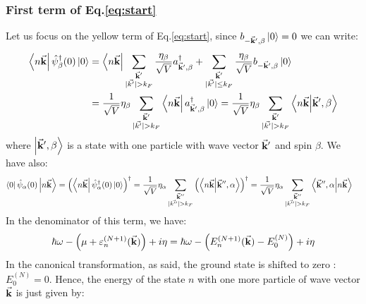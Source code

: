 \documentclass[11pt, a4paper, twoside, openright]{article}
\begin{document}
\subsubsection*{First term of Eq.\eqref{eq:start}}
Let us focus on the yellow term of Eq.\eqref{eq:start}, since \( b_{-\va{k}',\beta } \ket{0} = 0 \) we can write:
\begin{equation*}
\begin{split}
  \bra{n \va{k}} \hat{\psi }_ \beta ^\dag (0) \ket{0} &=
  \bra{n \va{k}} \sum_{\substack{\va{k}' \\ | \vec{k'} | > k_F  } }^{}  \frac{\eta _ \beta }{\sqrt{V} } a_{\va{k}', \beta } ^\dag
  +
  \sum_{\substack{\va{k}' \\ | \vec{k'} | \le k_F  } }^{}  \frac{\eta _ \beta }{\sqrt{V} } b_{-\va{k}', \beta } \ket{0} \\
  &=
  \frac{1}{\sqrt{V} } \eta _ \beta
  \sum_{\substack{\va{k}' \\ | \vec{k'} | > k_F  } }^{}   \bra{n \va{k}}
  a_{\va{k}', \beta } ^\dag \ket{0}
 = \frac{1}{\sqrt{V} } \eta _ \beta
 \sum_{\substack{\va{k}' \\ | \vec{k'} | > k_F  } }^{}   \braket{n \va{k}}{\va{k}', \beta }
\end{split}
\end{equation*}
where \( \ket{\va{k}', \beta }  \) is a state with one particle with wave vector \( \va{k}' \) and spin \( \beta  \).
We have also:
\begin{equation*}
\begin{split}
  \bra{0} \hat{\psi }_ \alpha
     (0) \ket{ n \va{k}} &=
    \qty( \bra{ n \va{k}} \hat{\psi }_ \alpha ^\dag
      (0) \ket{ 0 } ) ^\dag
     =   \frac{1}{\sqrt{V} } \eta _ \alpha
     \sum_{\substack{\va{k}'' \\ | \vec{k''} | > k_F  } }^{} \qty(  \braket{n \va{k}}{\va{k}'', \alpha  } ) ^\dag
     = \frac{1}{\sqrt{V} } \eta _ \alpha
     \sum_{\substack{\va{k}'' \\ | \vec{k''} | > k_F  } }^{}  \braket{\va{k}'', \alpha  }{n \va{k}}
\end{split}
\end{equation*}
In the denominator of this term, we have:
\begin{equation*}
  \hbar \omega - \qty( \mu + \varepsilon _n^{(N+1)}(\va{k})) + i \eta
  =   \hbar \omega - \qty(  E_n^{(N+1)} (\va{k}) - E_0^{(N)} ) + i \eta
\end{equation*}
In the canonical transformation, as said, the ground state is shifted to zero
: \( E_0^{(N)} = 0 \). Hence, the energy of the state \( n \) with one more particle of wave vector \( \va{k} \) is just given by:
\end{document}
